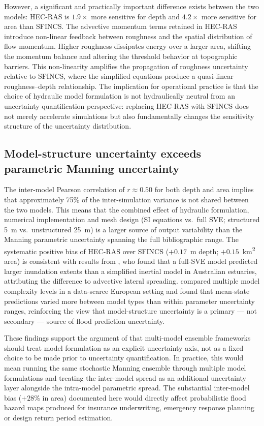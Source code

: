 \documentclass[review,12pt]{elsarticle}
\newcommand{\sfincs}{\textsc{SFINCS}}
\newcommand{\hecras}{\textsc{HEC-RAS}}
\begin{document}
However, a significant and practically important difference exists between
the two models: \hecras{} is $1.9\times$ more sensitive for depth and
$4.2\times$ more sensitive for area than \sfincs{}.
The advective momentum terms retained in \hecras{} introduce non-linear
feedback between roughness and the spatial distribution of flow momentum.
Higher roughness dissipates energy over a larger area, shifting the momentum
balance and altering the threshold behavior at topographic barriers.
This non-linearity amplifies the propagation of roughness uncertainty
relative to \sfincs{}, where the simplified equations produce a quasi-linear
roughness--depth relationship.
The implication for operational practice is that the choice of hydraulic
model formulation is not hydraulically neutral from an uncertainty quantification
perspective: replacing \hecras{} with \sfincs{} does not merely accelerate
simulations but also fundamentally changes the sensitivity structure of
the uncertainty distribution.

\subsection{Model-structure uncertainty exceeds parametric Manning uncertainty}
\label{sec:disc_modelstructure}

The inter-model Pearson correlation of $r \approx 0.50$ for both depth and
area implies that approximately 75\% of the inter-simulation variance is
not shared between the two models.
This means that the combined effect of hydraulic formulation, numerical
implementation and mesh design (SI equations vs.\ full SVE; structured 5~m
vs.\ unstructured 25~m) is a larger source of output variability than the
Manning parametric uncertainty spanning the full bibliographic range.
The systematic positive bias of \hecras{} over \sfincs{} ($+0.17$~m depth;
$+0.15$~km\textsuperscript{2} area) is consistent with results from
\citet{kumbier2019}, who found that a full-SVE model predicted larger
inundation extents than a simplified inertial model in Australian estuaries,
attributing the difference to advective lateral spreading.
\citet{vandaele2024} compared multiple model complexity levels in a
data-scarce European setting and found that mean-state predictions varied
more between model types than within parameter uncertainty ranges,
reinforcing the view that model-structure uncertainty is a primary ---
not secondary --- source of flood prediction uncertainty.

These findings support the argument of \citet{teng2017} that multi-model
ensemble frameworks should treat model formulation as an explicit uncertainty
axis, not as a fixed choice to be made prior to uncertainty quantification.
In practice, this would mean running the same stochastic Manning ensemble
through multiple model formulations and treating the inter-model spread as
an additional uncertainty layer alongside the intra-model parametric spread.
The substantial inter-model bias ($+28\%$ in area) documented here would
directly affect probabilistic flood hazard maps produced for insurance
underwriting, emergency response planning or design return period estimation.
\end{document}
